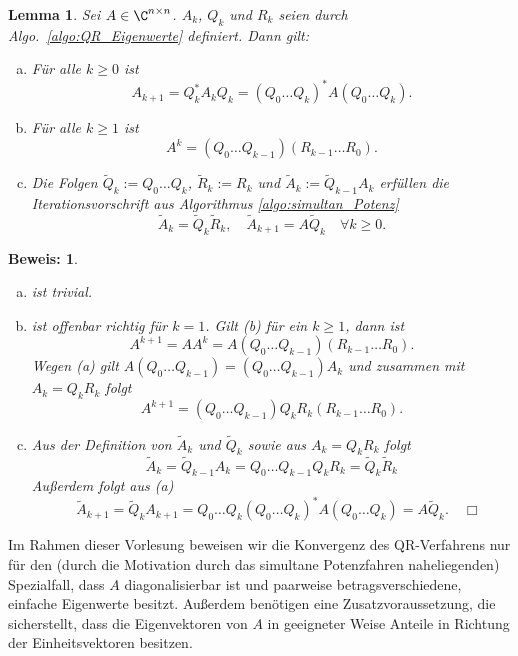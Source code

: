\documentclass[
]{mycourse}
\theoremstyle{mythm}
\newtheorem{lemma}[theorem]{Lemma}
\theoremstyle{break}
\newtheorem*{beweis}{Beweis:}
\begin{document}
\begin{lemma}\label{lemma_QR_hilf}
Sei $A\in \C^{n\times n}$. %
$A_k$, $Q_k$ und $R_k$ seien durch Algo.~\ref{algo:QR_Eigenwerte} definiert. Dann gilt:
\begin{enumerate}[(a)]
\item Für alle $k\geq 0$ ist 
\[
A_{k+1}=Q_k^* A_k Q_k=(Q_0 \ldots Q_k)^* A (Q_0 \ldots Q_k).
\]
\item Für alle $k\geq 1 $ ist 
\[
A^k=(Q_0 \dots Q_{k-1})(R_{k-1} \dots R_0).
\]
\item Die Folgen $\tilde Q_k:=Q_0\dots Q_{k}$, $\tilde R_k:=R_k$ und $\tilde A_k:=\tilde Q_{k-1} A_k$ erfüllen
die Iterationsvorschrift aus Algorithmus \ref{algo:simultan_Potenz}
\[
\tilde A_k=\tilde Q_k \tilde R_k, \quad \tilde A_{k+1}=A \tilde Q_k \quad \forall k\geq 0.
\]
\end{enumerate}
\end{lemma}
\begin{beweis}
\begin{enumerate}[(a)]
\item ist trivial.
\item ist offenbar richtig für $k=1$. Gilt (b) für ein $k\geq 1$, dann ist
\[
A^{k+1}=A A^k = A (Q_0 \dots Q_{k-1})(R_{k-1} \dots R_0).
\]
Wegen (a) gilt $A (Q_0 \dots Q_{k-1})=(Q_0 \dots Q_{k-1}) A_k$ und zusammen mit $A_k=Q_k R_k$ folgt
\[
A^{k+1}=(Q_0 \dots Q_{k-1}) Q_k R_k (R_{k-1} \dots R_0).
\]
\item Aus der Definition von $\tilde A_k$ und $\tilde Q_k$ sowie aus $A_k=Q_kR_k$ folgt
\[
\tilde A_k=\tilde Q_{k-1} A_k= Q_0\dots Q_{k-1} Q_k R_k = \tilde Q_k \tilde R_k
\]
Außerdem folgt aus (a)
\[
\quad \tilde A_{k+1}=\tilde Q_k A_{k+1}=Q_0\dots Q_{k} (Q_0 \ldots Q_{k})^* A (Q_0 \ldots Q_{k})=A \tilde Q_k. \quad \Box
\]
\end{enumerate}
\end{beweis}

Im Rahmen dieser Vorlesung beweisen wir die Konvergenz des QR-Verfahrens nur für den (durch die Motivation durch das
simultane Potenzfahren naheliegenden) Spezialfall, dass $A$ diagonalisierbar ist
und paarweise betragsverschiedene, einfache Eigenwerte besitzt. Außerdem benötigen eine Zusatzvoraussetzung, die
sicherstellt, dass die Eigenvektoren von $A$ in geeigneter Weise Anteile in Richtung der Einheitsvektoren
besitzen.
\end{document}
